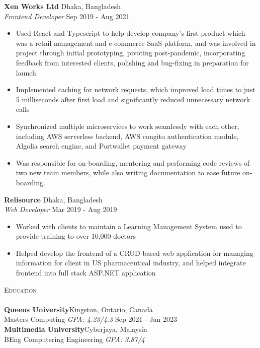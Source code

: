 \documentclass[a4paper]{article}
\newcommand{\lineunder} {
    \vspace*{-8pt} \\
    \hspace*{-18pt} \hrulefill \\
}
\newcommand{\header} [1] {
    {\hspace*{-18pt}\vspace*{6pt} \textsc{#1}}
    \vspace*{-6pt} \lineunder
}
\begin{document}
\textbf{Xen Works Ltd} \hfill Dhaka, Bangladesh\\
\textit{Frontend Developer} \hfill Sep 2019 - Aug 2021\\
\vspace{-1mm}
\begin{itemize} \itemsep 1pt
	\item Used React and Typescript to help develop company's first product which was a retail management and e-commerce SaaS platform, and was involved in project through initial prototyping, pivoting post-pandemic, incorporating feedback from interested clients, polishing and bug-fixing in preparation for launch
	\item Implemented caching for network requests, which improved load times to just 5 milliseconds after first load and significantly reduced unnecessary network calls
	\item Synchronized multiple microservices to work seamlessly with each other, including AWS serverless backend, AWS congito authentication module, Algolia search engine, and Portwallet payment gateway
	\item Was responsible for on-boarding, mentoring and performing code reviews of two new team members, while also writing documentation to ease future on-boarding.
\end{itemize}

\textbf{Relisource} \hfill Dhaka, Bangladesh\\
\textit{Web Developer} \hfill Mar 2019 - Aug 2019\\
\vspace{-1mm}
\begin{itemize} \itemsep 1pt
	\item Worked with clients to maintain a Learning Management System used to provide training to over 10,000 doctors
	\item Helped develop the frontend of a CRUD based web application for managing information for client in US pharmaceutical industry, and helped integrate frontend into full stack ASP.NET application
\end{itemize}

\header{Education}
\textbf{Queen\textquotesingle{}s University}\hfill Kingston, Ontario, Canada\\
Master\textquotesingle{}s Computing \textit{GPA: 4.23/4.3} \hfill Sep 2021 - Jan 2023\\
\vspace{2mm}
\textbf{Multimedia University}\hfill Cyberjaya, Malaysia\\
BEng Computering Engineering \textit{GPA: 3.87/4}\\
\vspace{2mm}
\end{document}
